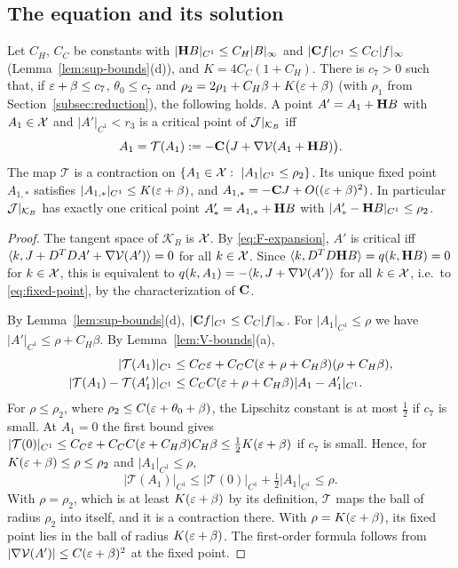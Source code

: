 \subsection{The equation and its solution}\label{ss:26.3}

\begin{proposition}\label{prop:contraction}
Let $C_H$, $C_C$ be constants with $|\mathbf H B|_{C^1}\le C_H|B|_\infty$ and $|\mathbf C f|_{C^1}\le C_C|f|_\infty$ (Lemma~\ref{lem:sup-bounds}(d)), and $K=4C_C(1+C_H)$. There is $c_7>0$ such that, if $\varepsilon+\beta\le c_7$, $\theta_0\le c_7$ and $\rho_2=2\rho_1+C_H\beta+K(\varepsilon+\beta)$ (with $\rho_1$ from Section~\ref{subsec:reduction}), the following holds. A point $A'=A_1+\mathbf H B$ with $A_1\in\mathcal X$ and $|A'|_{C^1}<r_3$ is a critical point of $\mathcal J|_{\mathcal K_B}$ iff
\begin{equation}\label{eq:fixed-point}
A_1=\mathcal T(A_1):=-\mathbf C\big(J+\nabla\mathcal V(A_1+\mathbf H B)\big).
\end{equation}
The map $\mathcal T$ is a contraction on $\{A_1\in\cX:\ |A_1|_{C^1}\le\rho_2\}$. Its unique fixed point $A_{1,*}$ satisfies $|A_{1,*}|_{C^1}\le K(\varepsilon+\beta)$, and $A_{1,*}=-\mathbf C J+O((\varepsilon+\beta)^2)$. In particular $\mathcal J|_{\mathcal K_B}$ has exactly one critical point $A'_*=A_{1,*}+\mathbf H B$ with $|A'_*-\mathbf H B|_{C^1}\le\rho_2$.
\end{proposition}

\begin{proof}
The tangent space of $\mathcal K_B$ is $\mathcal X$. By \eqref{eq:F-expansion}, $A'$ is critical iff $\langle k,J+D^TDA'+\nabla\mathcal V(A')\rangle=0$ for all $k\in\mathcal X$. Since $\langle k,D^TD\mathbf H B\rangle=q(k,\mathbf H B)=0$ for $k\in\mathcal X$, this is equivalent to $q(k,A_1)=-\langle k,J+\nabla\mathcal V(A')\rangle$ for all $k\in\mathcal X$, i.e.\ to \eqref{eq:fixed-point}, by the characterization of $\mathbf C$.

By Lemma~\ref{lem:sup-bounds}(d), $|\mathbf C f|_{C^1}\le C_C|f|_\infty$. For $|A_1|_{C^1}\le\rho$ we have $|A'|_{C^1}\le\rho+C_H\beta$. By Lemma~\ref{lem:V-bounds}(a),
\[
\begin{aligned}
|\mathcal T(A_1)|_{C^1}&\le C_C\varepsilon+C_CC(\varepsilon+\rho+C_H\beta)(\rho+C_H\beta),\\
|\mathcal T(A_1)-\mathcal T(A_1')|_{C^1}&\le C_CC(\varepsilon+\rho+C_H\beta)|A_1-A_1'|_{C^1}.
\end{aligned}
\]
For $\rho\le\rho_2$, where $\rho_2\le C(\varepsilon+\theta_0+\beta)$, the Lipschitz constant is at most $\frac12$ if $c_7$ is small. At $A_1=0$ the first bound gives $|\mathcal T(0)|_{C^1}\le C_C\varepsilon+C_CC(\varepsilon+C_H\beta)C_H\beta\le\frac12K(\varepsilon+\beta)$ if $c_7$ is small. Hence, for $K(\varepsilon+\beta)\le\rho\le\rho_2$ and $|A_1|_{C^1}\le\rho$,
\[
|\mathcal T(A_1)|_{C^1}\le|\mathcal T(0)|_{C^1}+\tfrac12|A_1|_{C^1}\le\rho .
\]
With $\rho=\rho_2$, which is at least $K(\varepsilon+\beta)$ by its definition, $\mathcal T$ maps the ball of radius $\rho_2$ into itself, and it is a contraction there. With $\rho=K(\varepsilon+\beta)$, its fixed point lies in the ball of radius $K(\varepsilon+\beta)$. The first-order formula follows from $|\nabla\mathcal V(A')|\le C(\varepsilon+\beta)^2$ at the fixed point.
\end{proof}

